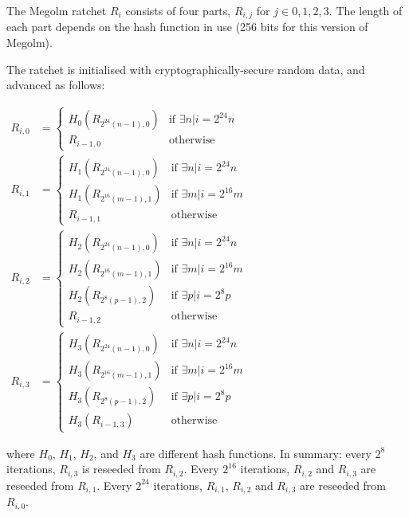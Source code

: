 \documentclass[10pt]{article}
\begin{document}
The Megolm ratchet \(R_i\) consists of four parts, \(R_{i,j}\) for
\(j \in {0,1,2,3}\). The length of each part depends on the hash
function in use (256 bits for this version of Megolm).

The ratchet is initialised with cryptographically-secure random data,
and advanced as follows:

$\begin{aligned}
R_{i,0} &=
  \begin{cases}
  H_0\left(R_{2^{24}(n-1),0}\right) &\text{if }\exists n | i = 2^{24}n\\
  R_{i-1,0} &\text{otherwise}
  \end{cases}\\
R_{i,1} &=
  \begin{cases}
  H_1\left(R_{2^{24}(n-1),0}\right) &\text{if }\exists n | i = 2^{24}n\\
  H_1\left(R_{2^{16}(m-1),1}\right) &\text{if }\exists m | i = 2^{16}m\\
  R_{i-1,1} &\text{otherwise}
  \end{cases}\\
R_{i,2} &=
  \begin{cases}
  H_2\left(R_{2^{24}(n-1),0}\right) &\text{if }\exists n | i = 2^{24}n\\
  H_2\left(R_{2^{16}(m-1),1}\right) &\text{if }\exists m | i = 2^{16}m\\
  H_2\left(R_{2^8(p-1),2}\right) &\text{if }\exists p | i = 2^8p\\
  R_{i-1,2} &\text{otherwise}
  \end{cases}\\
R_{i,3} &=
  \begin{cases}
  H_3\left(R_{2^{24}(n-1),0}\right) &\text{if }\exists n | i = 2^{24}n\\
  H_3\left(R_{2^{16}(m-1),1}\right) &\text{if }\exists m | i = 2^{16}m\\
  H_3\left(R_{2^8(p-1),2}\right) &\text{if }\exists p | i = 2^8p\\
  H_3\left(R_{i-1,3}\right) &\text{otherwise}
  \end{cases}
\end{aligned}$

where \(H_0\), \(H_1\), \(H_2\), and \(H_3\) are different hash
functions. In summary: every \(2^8\) iterations, \(R_{i,3}\) is reseeded
from \(R_{i,2}\). Every \(2^{16}\) iterations, \(R_{i,2}\) and
\(R_{i,3}\) are reseeded from \(R_{i,1}\). Every \(2^{24}\)
iterations, \(R_{i,1}\), \(R_{i,2}\) and \(R_{i,3}\) are reseeded
from \(R_{i,0}\).
\end{document}
